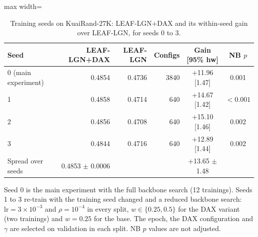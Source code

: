 \begin{table}[tbp]
\centering
\footnotesize
\caption{Training seeds on KuaiRand-27K: LEAF-LGN+DAX and its within-seed gain over LEAF-LGN, for seeds 0 to 3.}
\label{tab:seeds}
\begin{adjustbox}{max width=\linewidth}
\begin{tabular}{lrrrcc}
\toprule
Seed & LEAF-LGN+DAX & LEAF-LGN & Configs & Gain [95\% hw] & NB $p$ \\
\midrule
0 (main experiment) & 0.4854 & 0.4736 & 3840 & +11.96 [1.47] & 0.001 \\
1 & 0.4858 & 0.4714 & 640 & +14.67 [1.42] & $<0.001$ \\
2 & 0.4856 & 0.4708 & 640 & +15.10 [1.46] & 0.002 \\
3 & 0.4844 & 0.4716 & 640 & +12.89 [1.44] & 0.002 \\
\midrule
Spread over seeds & 0.4853 $\pm$ 0.0006 &  &  & +13.65 $\pm$ 1.48 &  \\
\bottomrule
\end{tabular}
\end{adjustbox}
\par\smallskip
\begin{minipage}{\linewidth}\raggedright\footnotesize Seed 0 is the main experiment with the full backbone search (12 trainings). Seeds 1 to 3 re-train with the training seed changed and a reduced backbone search: $\mathrm{lr}=3\times10^{-3}$ and $\rho=10^{-4}$ in every split, $w\in\{0.25,0.5\}$ for the DAX variant (two trainings) and $w=0.25$ for the base. The epoch, the DAX configuration and $\gamma$ are selected on validation in each split. NB $p$ values are not adjusted.\end{minipage}
\end{table}
